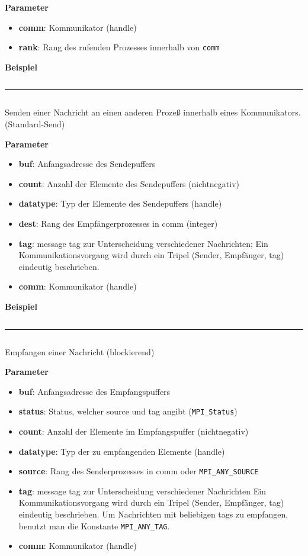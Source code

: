\textbf{Parameter}
\begin{itemize}
    \item \textbf{comm}: Kommunikator (handle)
    \item \textbf{rank}: Rang des rufenden Prozesses innerhalb von \texttt{comm}
\end{itemize}

\textbf{Beispiel}
\inputminted[numbersep=5pt, tabsize=4]{c}{scripts/mpi/comm-rank-example.c}
\rule{\textwidth}{0.4pt}
\inputminted[numbersep=5pt, tabsize=4]{c}{scripts/mpi/mpi-send.c}
Senden einer Nachricht an einen anderen Prozeß innerhalb eines Kommunikators. (Standard-Send)

\textbf{Parameter}
\begin{itemize}
    \item \textbf{buf}: Anfangsadresse des Sendepuffers 
    \item \textbf{count}: Anzahl der Elemente des Sendepuffers (nichtnegativ) 
    \item \textbf{datatype}: Typ der Elemente des Sendepuffers (handle)
    \item \textbf{dest}: Rang des Empfängerprozesses in comm (integer)
    \item \textbf{tag}: message tag zur Unterscheidung verschiedener Nachrichten; 
Ein Kommunikationsvorgang wird durch ein Tripel (Sender, Empfänger, tag) eindeutig beschrieben. 
    \item \textbf{comm}: Kommunikator (handle)
\end{itemize}

\textbf{Beispiel}
\inputminted[numbersep=5pt, tabsize=4]{c}{scripts/mpi/mpi-send-example.c}
\rule{\textwidth}{0.4pt}
\inputminted[numbersep=5pt, tabsize=4]{c}{scripts/mpi/mpi-receive.c}
Empfangen einer Nachricht (blockierend) 

\textbf{Parameter}
\begin{itemize}
    \item \textbf{buf}: Anfangsadresse des Empfangspuffers
    \item \textbf{status}: Status, welcher source und tag angibt (\texttt{MPI\_Status}) 
    \item \textbf{count}: Anzahl der Elemente im Empfangspuffer (nichtnegativ)
    \item \textbf{datatype}: Typ der zu empfangenden Elemente (handle)
    \item \textbf{source}: Rang des Senderprozesses in comm oder \texttt{MPI\_ANY\_SOURCE}
    \item \textbf{tag}: message tag zur Unterscheidung verschiedener Nachrichten
                  Ein Kommunikationsvorgang wird durch ein Tripel (Sender, Empfänger, tag) eindeutig beschrieben. Um Nachrichten mit beliebigen tags zu empfangen, benutzt man die Konstante \texttt{MPI\_ANY\_TAG}.
    \item \textbf{comm}: Kommunikator (handle) 
\end{itemize}

